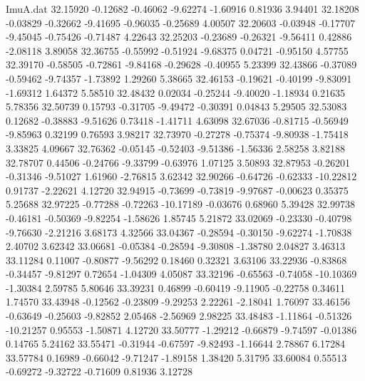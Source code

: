 \begin{filecontents}{ImuA.dat}
  32.15920   -0.12682   -0.46062   -9.62274   -1.60916    0.81936    3.94401
  32.18208   -0.03829   -0.32662   -9.41695   -0.96035   -0.25689    4.00507
  32.20603   -0.03948   -0.17707   -9.45045   -0.75426   -0.71487    4.22643
  32.25203   -0.23689   -0.26321   -9.56411    0.42886   -2.08118    3.89058
  32.36755   -0.55992   -0.51924   -9.68375    0.04721   -0.95150    4.57755
  32.39170   -0.58505   -0.72861   -9.84168   -0.29628   -0.40955    5.23399
  32.43866   -0.37089   -0.59462   -9.74357   -1.73892    1.29260    5.38665
  32.46153   -0.19621   -0.40199   -9.83091   -1.69312    1.64372    5.58510
  32.48432    0.02034   -0.25244   -9.40020   -1.18934    0.21635    5.78356
  32.50739    0.15793   -0.31705   -9.49472   -0.30391    0.04843    5.29505
  32.53083    0.12682   -0.38883   -9.51626    0.73418   -1.41711    4.63098
  32.67036   -0.81715   -0.56949   -9.85963    0.32199    0.76593    3.98217
  32.73970   -0.27278   -0.75374   -9.80938   -1.75418    3.33825    4.09667
  32.76362   -0.05145   -0.52403   -9.51386   -1.56336    2.58258    3.82188
  32.78707    0.44506   -0.24766   -9.33799   -0.63976    1.07125    3.50893
  32.87953   -0.26201   -0.31346   -9.51027    1.61960   -2.76815    3.62342
  32.90266   -0.64726   -0.62333  -10.22812    0.91737   -2.22621    4.12720
  32.94915   -0.73699   -0.73819   -9.97687   -0.00623    0.35375    5.25688
  32.97225   -0.77288   -0.72263  -10.17189   -0.03676    0.68960    5.39428
  32.99738   -0.46181   -0.50369   -9.82254   -1.58626    1.85745    5.21872
  33.02069   -0.23330   -0.40798   -9.76630   -2.21216    3.68173    4.32566
  33.04367   -0.28594   -0.30150   -9.62274   -1.70838    2.40702    3.62342
  33.06681   -0.05384   -0.28594   -9.30808   -1.38780    2.04827    3.46313
  33.11284    0.11007   -0.80877   -9.56292    0.18460    0.32321    3.63106
  33.22936   -0.83868   -0.34457   -9.81297    0.72654   -1.04309    4.05087
  33.32196   -0.65563   -0.74058  -10.10369   -1.30384    2.59785    5.80646
  33.39231    0.46899   -0.60419   -9.11905   -0.22758    0.34611    1.74570
  33.43948   -0.12562   -0.23809   -9.29253    2.22261   -2.18041    1.76097
  33.46156   -0.63649   -0.25603   -9.82852    2.05468   -2.56969    2.98225
  33.48483   -1.11864   -0.51326  -10.21257    0.95553   -1.50871    4.12720
  33.50777   -1.29212   -0.66879   -9.74597   -0.01386    0.14765    5.24162
  33.55471   -0.31944   -0.67597   -9.82493   -1.16644    2.78867    6.17284
  33.57784    0.16989   -0.66042   -9.71247   -1.89158    1.38420    5.31795
  33.60084    0.55513   -0.69272   -9.32722   -0.71609    0.81936    3.12728

\end{filecontents}
